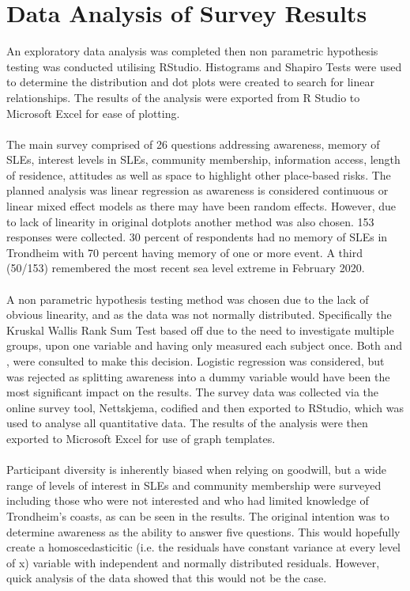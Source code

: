 \section{Data Analysis of Survey Results}
An exploratory data analysis was completed then non parametric hypothesis testing was conducted utilising RStudio. Histograms and Shapiro Tests were used to determine the distribution and dot plots were created to search for linear relationships. The results of the analysis were exported from R Studio to Microsoft Excel for ease of plotting.
\paragraph{}
The main survey comprised of 26 questions addressing awareness, memory of SLEs, interest levels in SLEs, community membership, information access, length of residence, attitudes as well as space to highlight other place-based risks. The planned analysis was linear regression as awareness is considered continuous or linear mixed effect models as there may have been random effects. However, due to lack of linearity in original dotplots another method was also chosen. 153 responses were collected. 30 percent of respondents had no memory of SLEs in Trondheim with 70 percent having memory of one or more event. A third (50/153) remembered the most recent sea level extreme in February 2020. 
\paragraph{}
A non parametric hypothesis testing method was chosen due to the lack of obvious linearity, and as the data was not normally distributed. Specifically the Kruskal Wallis Rank Sum Test based off \cite{hollander_nonparametric_2014} due to the need to investigate multiple groups, upon one variable and having only measured each subject once. Both \cite{tasman_how_2014} and \cite{hollander_nonparametric_2014}, were consulted to make this decision. Logistic regression was considered, but was rejected as splitting awareness into a dummy variable would have been the most significant impact on the results. The survey data was collected via the online survey tool, Nettskjema, codified and then exported to RStudio, which was used to analyse all quantitative data. The results of the analysis were then exported to Microsoft Excel for use of graph templates.
\paragraph{}
Participant diversity is inherently biased when relying on goodwill, but a wide range of levels of interest in SLEs and community membership were surveyed including those who were not interested and who had limited knowledge of Trondheim’s coasts, as can be seen in the results. The original intention was to determine awareness as the ability to answer five questions. This would hopefully create a homoscedasticitic (i.e. the residuals have constant variance at every level of x) variable with independent and normally distributed residuals. However, quick analysis of the data showed that this would not be the case.
